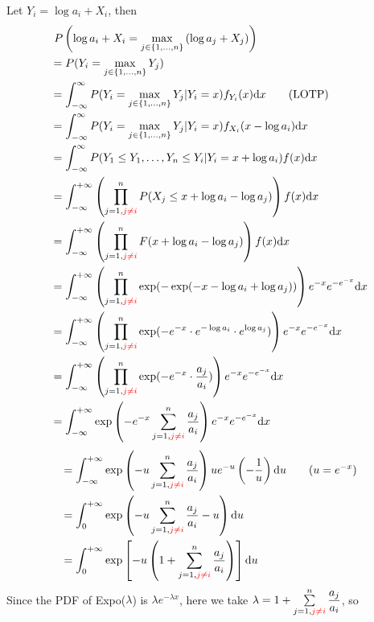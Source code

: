 \begin{homeworkProblem}
Let $Y_i=\log a_i+X_i$, then
\begin{align*}
&\ P\left(\log a_i+X_i=\max_{j \in\{1, \ldots, n\}}\left(\log a_j+X_j\right)\right) \\
&= P(Y_i=\max_{j \in\{1, \ldots, n\}} Y_j) \\
&= \int_{-\infty}^{\infty}P(Y_i=\max_{j \in\{1, \ldots, n\}} Y_j|Y_i=x)f_{Y_i}(x) \mathrm{d}x \qquad\text{(LOTP)} \\
&= \int_{-\infty}^{\infty}P(Y_i=\max_{j \in\{1, \ldots, n\}} Y_j|Y_i=x)f_{X_i}(x-\log a_i) \mathrm{d}x \\
&= \int_{-\infty}^{\infty}P(Y_1\leq Y_1, \ldots, Y_n\leq Y_i|Y_i=x+\log a_i)f(x) \mathrm{d}x \\
&= \int_{-\infty}^{+\infty} \left(\prod_{j=1,\textcolor{red}{j\neq i}}^{n} P(X_{j} \leq x + \log a_{i} - \log a_{j})\right)f(x) \mathrm{d}x \\
&= \int_{-\infty}^{+\infty} \left(\prod_{j=1,\textcolor{red}{j\neq i}}^{n} F(x + \log a_{i} - \log a_{j})\right)f(x) \mathrm{d}x \\
&= \int_{-\infty}^{+\infty} \left(\prod_{j=1,\textcolor{red}{j\neq i}}^{n} \exp(- \exp(-x - \log a_{i} + \log a_{j}))\right) e^{-x}e^{-e^{-x}} \mathrm{d}x \\
&= \int_{-\infty}^{+\infty} \left(\prod_{j=1,\textcolor{red}{j\neq i}}^{n} \exp(- e^{-x}\cdot e^{-\log a_{i}} \cdot e^{\log a_{j}})\right) e^{-x}e^{-e^{-x}} \mathrm{d}x \\
&= \int_{-\infty}^{+\infty} \left(\prod_{j=1,\textcolor{red}{j\neq i}}^{n} \exp(- e^{-x}\cdot \frac{a_{j}}{a_{i}})\right) e^{-x}e^{-e^{-x}} \mathrm{d}x \\
&= \int_{-\infty}^{+\infty} \exp\left(- e^{-x} \sum_{j=1,\textcolor{red}{j\neq i}}^{n} \frac{a_{j}}{a_{i}}\right) e^{-x}e^{-e^{-x}} \mathrm{d}x \\
\end{align*}
\begin{align*}
&= \int_{-\infty}^{+\infty} \exp\left(-u \sum_{j=1,\textcolor{red}{j\neq i}}^{n} \frac{a_{j}}{a_{i}}\right) ue^{-u} \left(-\dfrac{1}{u}\right) \mathrm{d}u \qquad (u = e^{-x}) \\
&= \int_{0}^{+\infty} \exp\left(- u \sum_{j=1,\textcolor{red}{j\neq i}}^{n} \frac{a_{j}}{a_{i}} - u\right) \mathrm{d}u \\
&= \int_{0}^{+\infty} \exp\left[- u \left(1 + \sum_{j=1,\textcolor{red}{j\neq i}}^{n} \frac{a_{j}}{a_{i}}\right)\right] \mathrm{d}u
\end{align*}
Since the PDF of Expo($\lambda$) is $\lambda e^{-\lambda x}$, here we take $\lambda = 1 + \sum\limits_{j=1,\textcolor{red}{j\neq i}}^{n} \dfrac{a_{j}}{a_{i}}$, so


\end{homeworkProblem}
